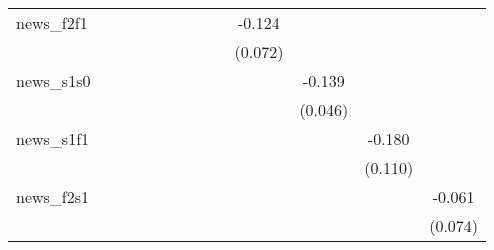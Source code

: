 {\begin{tabular}{l*{12}{c}}
\addlinespace
news\_f2f1   &                     &                     &                     &                     &                     &                     &                     &                     &      -0.124\sym{*}  &                     &                     &                     \\
            &                     &                     &                     &                     &                     &                     &                     &                     &     (0.072)         &                     &                     &                     \\
\addlinespace
news\_s1s0   &                     &                     &                     &                     &                     &                     &                     &                     &                     &      -0.139\sym{***}&                     &                     \\
            &                     &                     &                     &                     &                     &                     &                     &                     &                     &     (0.046)         &                     &                     \\
\addlinespace
news\_s1f1   &                     &                     &                     &                     &                     &                     &                     &                     &                     &                     &      -0.180         &                     \\
            &                     &                     &                     &                     &                     &                     &                     &                     &                     &                     &     (0.110)         &                     \\
\addlinespace
news\_f2s1   &                     &                     &                     &                     &                     &                     &                     &                     &                     &                     &                     &      -0.061         \\
            &                     &                     &                     &                     &                     &                     &                     &                     &                     &                     &                     &     (0.074)         \\

\end{tabular}}
